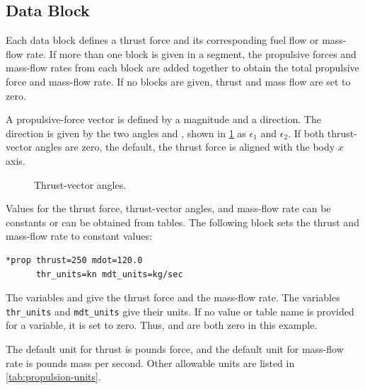 \subsection{ Data Block}\label{sec:block-prop}

Each  data block defines a thrust force and its corresponding
fuel flow or mass-flow rate. If more than one  block is given
in a segment, the propulsive forces and mass-flow rates from each block are added
together to obtain the total propulsive force and mass-flow rate. If no
 blocks are given, thrust and mass flow are set to zero.

A propulsive-force vector is defined by a magnitude and a direction. The direction is
given by the two angles  and , shown in
\cref{fig:thrust-vector-angles} as $\epsilon_1$ and $\epsilon_2$. If both thrust-vector
angles are zero, the default, the thrust force is aligned with the body $x$ axis.

\begin{figure}[htbp]
  \centering
  
  \caption{Thrust-vector angles.}
  \label{fig:thrust-vector-angles}
\end{figure}

Values for the thrust force, thrust-vector angles, and mass-flow rate can be constants
or can be obtained from tables. The following block sets the thrust and mass-flow
rate to constant values:

\begin{lstlisting}[style=taosmanual]
*prop thrust=250 mdot=120.0
      thr_units=kn mdt_units=kg/sec
\end{lstlisting}

The variables  and  give the thrust force and the
mass-flow rate. The variables \texttt{thr\_units} and \texttt{mdt\_units} give their
units. If no value or table name is provided for a variable, it is set to zero. Thus,
 and  are both zero in this example.

The default unit for thrust is pounds force, and the default unit for mass-flow rate is
pounds mass per second. Other allowable units are listed in
\cref{tab:propulsion-units}.

